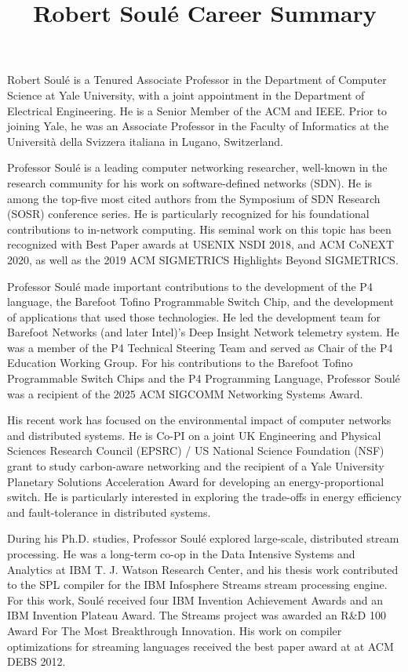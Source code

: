 \documentclass[11pt]{article}
\title{ Robert Soul\'{e} Career Summary}
\author{  }
\date{ }
\begin{document}
\maketitle	
\thispagestyle{empty}


Robert Soul\'{e} is a Tenured Associate Professor in the Department of
Computer Science at Yale University, with a joint appointment in the
Department of Electrical Engineering. He is a Senior Member of the ACM
and IEEE.  Prior to joining Yale, he was an Associate Professor in the
Faculty of Informatics at the Universit\`{a} della Svizzera italiana
in Lugano, Switzerland.

Professor Soul\'{e} is a leading computer networking researcher,
well-known in the research community for his work on software-defined
networks (SDN). He is among the top-five most cited authors from the
Symposium of SDN Research (SOSR) conference series. He is particularly
recognized for his foundational contributions to in-network
computing. His seminal work on this topic has been recognized with
Best Paper awards at USENIX NSDI 2018, and ACM CoNEXT 2020, as well as
the 2019 ACM SIGMETRICS Highlights Beyond SIGMETRICS.


Professor Soul\'{e} made important contributions to the development of
the P4 language, the Barefoot Tofino Programmable Switch Chip, and the
development of applications that used those technologies. He led the
development team for Barefoot Networks (and later Intel)'s Deep
Insight Network telemetry system. He was a member of the P4 Technical
Steering Team and served as Chair of the P4 Education Working
Group. For his contributions to the Barefoot Tofino Programmable
Switch Chips and the P4 Programming Language, Professor Soul\'{e} was
a recipient of the 2025 ACM SIGCOMM Networking Systems Award.

His recent work has focused on the environmental impact of computer
networks and distributed systems. He is Co-PI on a joint UK
Engineering and Physical Sciences Research Council (EPSRC) / US
National Science Foundation (NSF) grant to study carbon-aware
networking and the recipient of a Yale University Planetary Solutions
Acceleration Award for developing an energy-proportional switch. He is
particularly interested in exploring the trade-offs in energy
efficiency and fault-tolerance in distributed systems.

During his Ph.D. studies, Professor Soul\'{e} explored large-scale,
distributed stream processing. He was a long-term co-op in the
Data Intensive Systems and Analytics at IBM T. J. Watson Research
Center, and his thesis work contributed to the SPL compiler for the
IBM Infosphere Streams stream processing engine. For this work,
Soul\'{e} received four IBM Invention Achievement Awards and an IBM
Invention Plateau Award. The Streams project was awarded an R\&D 100
Award For The Most Breakthrough Innovation.  His work on compiler
optimizations for streaming languages received the best paper award at
at ACM DEBS 2012.
\end{document}
